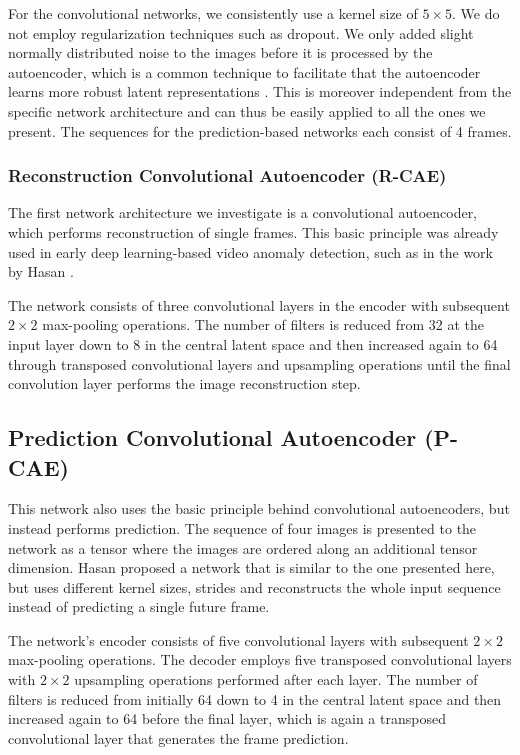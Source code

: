 \documentclass[10pt,twocolumn,letterpaper]{article}
\begin{document}
For the convolutional networks, we consistently use a kernel size of $5{\times}5$. We do not employ regularization techniques such as dropout. We only added slight normally distributed noise to the images before it is processed by the autoencoder, which is a common technique to facilitate that the autoencoder learns more robust latent representations \cite{denoising_ae}. This is moreover independent from the specific network architecture and can thus be easily applied to all the ones we present. The sequences for the prediction-based networks each consist of \num{4} frames.

\subsubsection{Reconstruction Convolutional Autoencoder (R-CAE)}
The first network architecture we investigate is a convolutional autoencoder, which performs reconstruction of single frames. This basic principle was already used in early deep learning-based video anomaly detection, such as in the work by Hasan \etal \cite{conv_ae_ad}.

The network consists of three convolutional layers in the encoder with subsequent $2{\times}2$ max-pooling operations. The number of filters is reduced from \num{32} at the input layer down to \num{8} in the central latent space and then increased again to \num{64} through transposed convolutional layers and upsampling operations until the final convolution layer performs the image reconstruction step.

\subsection{Prediction Convolutional Autoencoder (P-CAE)}
This network also uses the basic principle behind convolutional autoencoders, but instead performs prediction. The sequence of four images is presented to the network as a tensor where the images are ordered along an additional tensor dimension. Hasan \etal \cite{conv_ae_ad} proposed a network that is similar to the one presented here, but uses different kernel sizes, strides and reconstructs the whole input sequence instead of predicting a single future frame.

The network's encoder consists of five convolutional layers with subsequent $2{\times}2$ max-pooling operations. The decoder employs five transposed convolutional layers with $2{\times}2$ upsampling operations performed after each layer. The number of filters is reduced from initially \num{64} down to \num{4} in the central latent space and then increased again to \num{64} before the final layer, which is again a transposed convolutional layer that generates the frame prediction.
\end{document}

